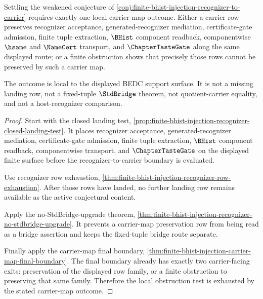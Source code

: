\begin{theorem}
\label{thm:finite-bhist-injection-carrier-map-local-obstruction}
Settling the weakened conjecture of \autoref{conj:finite-bhist-injection-recognizer-to-carrier} requires exactly one local carrier-map outcome. Either a carrier row preserves recognizer acceptance, generated-recognizer mediation, certificate-gate admission, finite tuple extraction, $\BHist$ component readback, componentwise $\hsame$ and $\NameCert$ transport, and $\ChapterTasteGate$ along the same displayed route; or a finite obstruction shows that precisely those rows cannot be preserved by such a carrier map.

The outcome is local to the displayed BEDC support surface. It is not a missing landing row, not a fixed-tuple $\StdBridge$ theorem, not quotient-carrier equality, and not a host-recognizer comparison.
\end{theorem}
\begin{proof}
Start with the closed landing test, \autoref{prop:finite-bhist-injection-recognizer-closed-landing-test}. It places recognizer acceptance, generated-recognizer mediation, certificate-gate admission, finite tuple extraction, $\BHist$ component readback, componentwise transport, and $\ChapterTasteGate$ on the displayed finite surface before the recognizer-to-carrier boundary is evaluated.

Use recognizer row exhaustion, \autoref{thm:finite-bhist-injection-recognizer-row-exhaustion}. After those rows have landed, no further landing row remains available as the active conjectural content.

Apply the no-StdBridge-upgrade theorem, \autoref{thm:finite-bhist-injection-recognizer-no-stdbridge-upgrade}. It prevents a carrier-map preservation row from being read as a bridge assertion and keeps the fixed-tuple bridge route separate.

Finally apply the carrier-map final boundary, \autoref{thm:finite-bhist-injection-carrier-map-final-boundary}. The final boundary already has exactly two carrier-facing exits: preservation of the displayed row family, or a finite obstruction to preserving that same family. Therefore the local obstruction test is exhausted by the stated carrier-map outcome.
\end{proof}

